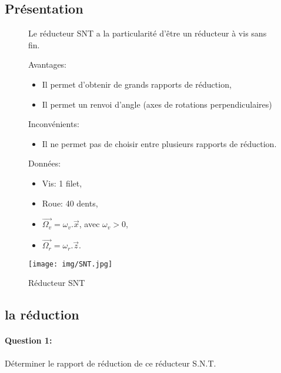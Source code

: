 \subsection{Présentation}

\begin{figure}[!h]
\begin{minipage}{0.6\linewidth}
Le réducteur SNT a la particularité d'être un réducteur à vis sans fin.

Avantages:
\begin{itemize}
 \item Il permet d'obtenir de grands rapports de réduction,
 \item Il permet un renvoi d'angle (axes de rotations perpendiculaires)
\end{itemize}

Inconvénients:
\begin{itemize}
 \item Il ne permet pas de choisir entre plusieurs rapports de réduction.
\end{itemize}

Données:
\begin{itemize}
 \item Vis: 1 filet,
 \item Roue: 40 dents,
 \item $\overrightarrow{\Omega_v}=\omega_v.\overrightarrow{x}$, avec $\omega_v>0$,
 \item $\overrightarrow{\Omega_r}=\omega_r.\overrightarrow{z}$.
\end{itemize}

\end{minipage}
 \hfill
\begin{minipage}{0.35\linewidth}
 \centering\texttt{[image: img/SNT.jpg]}
 \caption{Réducteur SNT}
 \label{fig3}
\end{minipage}
\end{figure}

\subsection{la réduction}

\paragraph{Question 1:} Déterminer le rapport de réduction de ce réducteur S.N.T.



